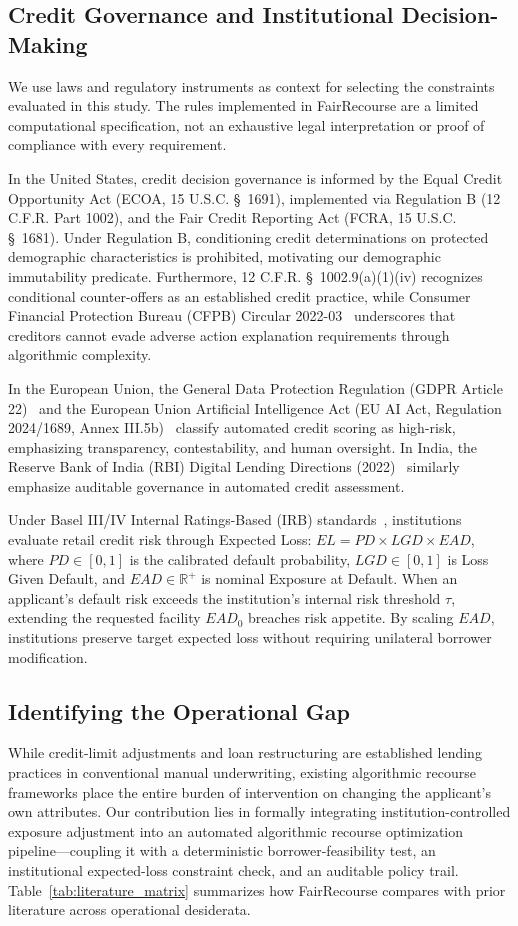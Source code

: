 \documentclass[manuscript,screen,review,anonymous]{acmart}
\begin{document}
\subsection{Credit Governance and Institutional Decision-Making}
We use laws and regulatory instruments as context for selecting the constraints evaluated in this study. The rules implemented in FairRecourse are a limited computational specification, not an exhaustive legal interpretation or proof of compliance with every requirement.

In the United States, credit decision governance is informed by the Equal Credit Opportunity Act (ECOA, 15 U.S.C. \S~1691), implemented via Regulation B (12 C.F.R. Part 1002), and the Fair Credit Reporting Act (FCRA, 15 U.S.C. \S~1681). Under Regulation B, conditioning credit determinations on protected demographic characteristics is prohibited, motivating our demographic immutability predicate. Furthermore, 12 C.F.R. \S~1002.9(a)(1)(iv) recognizes conditional counter-offers as an established credit practice, while Consumer Financial Protection Bureau (CFPB) Circular 2022-03~\cite{cfpb2022circular} underscores that creditors cannot evade adverse action explanation requirements through algorithmic complexity.

In the European Union, the General Data Protection Regulation (GDPR Article 22)~\cite{gdpr2016} and the European Union Artificial Intelligence Act (EU AI Act, Regulation 2024/1689, Annex III.5b)~\cite{euaiact2024} classify automated credit scoring as high-risk, emphasizing transparency, contestability, and human oversight. In India, the Reserve Bank of India (RBI) Digital Lending Directions (2022)~\cite{rbi2022digitallending} similarly emphasize auditable governance in automated credit assessment.

Under Basel III/IV Internal Ratings-Based (IRB) standards~\cite{bcbs2017basel}, institutions evaluate retail credit risk through Expected Loss: $EL = PD \times LGD \times EAD$, where $PD \in [0, 1]$ is the calibrated default probability, $LGD \in [0, 1]$ is Loss Given Default, and $EAD \in \mathbb{R}^+$ is nominal Exposure at Default. When an applicant's default risk exceeds the institution's internal risk threshold $\tau$, extending the requested facility $EAD_0$ breaches risk appetite. By scaling $EAD$, institutions preserve target expected loss without requiring unilateral borrower modification.

\subsection{Identifying the Operational Gap}
While credit-limit adjustments and loan restructuring are established lending practices in conventional manual underwriting, existing algorithmic recourse frameworks place the entire burden of intervention on changing the applicant's own attributes. Our contribution lies in formally integrating institution-controlled exposure adjustment into an automated algorithmic recourse optimization pipeline—coupling it with a deterministic borrower-feasibility test, an institutional expected-loss constraint check, and an auditable policy trail. Table~\ref{tab:literature_matrix} summarizes how FairRecourse compares with prior literature across operational desiderata.
\end{document}
